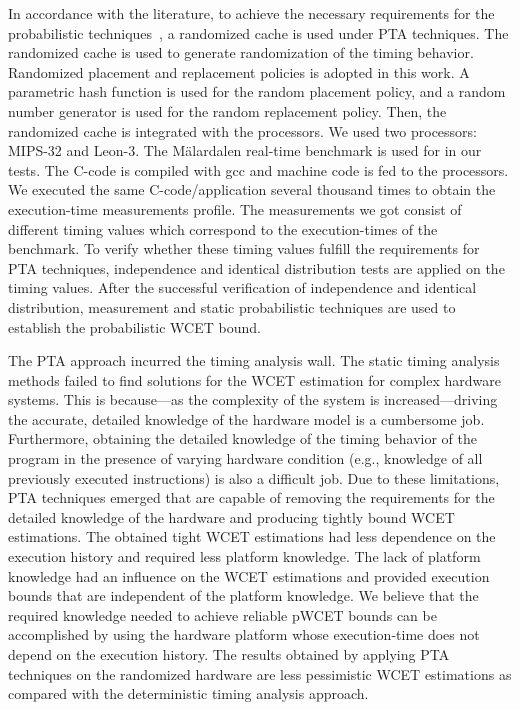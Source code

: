 In accordance with the literature, to achieve the necessary requirements for the probabilistic techniques~\cite{Cazorla:2013:PPA:2465787.2465796}, a  randomized cache is used under PTA techniques. The randomized cache is used to generate randomization of the timing behavior. Randomized placement and replacement policies is adopted in this work. A parametric hash function is used for the random placement policy, and a random number generator is used for the random replacement policy. Then, the randomized cache is integrated with the processors. We used two processors: MIPS-32 and Leon-3. The M\"alardalen real-time benchmark is used for in our tests. The C-code is compiled with gcc and machine code is fed to the processors. We executed the same C-code/application several thousand times to obtain the execution-time measurements profile. The measurements we got consist of different timing values which correspond to the execution-times of the benchmark. To verify whether these timing values fulfill the requirements for PTA techniques, independence and identical distribution tests are applied on the timing values. After the successful verification of independence and identical distribution, measurement and static probabilistic techniques are used to establish the probabilistic WCET bound.
    
 
    
The PTA approach incurred the timing analysis wall. The static timing analysis methods failed to find solutions for the WCET estimation for complex hardware systems. This is because---as the complexity of the system is increased---driving the accurate, detailed knowledge of the hardware model is a cumbersome job. Furthermore, obtaining the detailed knowledge of the timing behavior of the program in the presence of varying hardware condition (e.g., knowledge of all previously executed instructions) is also a  difficult job. Due to these limitations, PTA techniques emerged that are capable of removing the requirements for the detailed knowledge of the hardware and producing tightly bound WCET estimations. The obtained tight WCET estimations had less dependence on the execution history and required less platform knowledge. The lack of platform knowledge had an influence on the WCET estimations and provided execution bounds that are independent of the platform knowledge. We believe that the required knowledge needed to achieve reliable pWCET bounds can be accomplished by using the hardware platform whose execution-time does not depend on the execution history. The results obtained by applying PTA techniques on the randomized hardware are less pessimistic WCET estimations as compared with the deterministic timing analysis approach.
     
